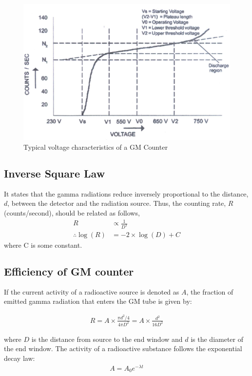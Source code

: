 \begin{figure}
    \centering
    \includegraphics[width=1\columnwidth]{images/t2.png}
    \caption{Typical voltage characteristics of a GM Counter}
    \label{t2}
\end{figure}

\subsection{Inverse Square Law}
It states that the gamma radiations reduce inversely proportional to the distance, $d$, between the detector and the radiation source. Thus, the counting rate, $R$ (counts/second), should be related as follows,
\begin{align} \label{inv-eq}
    R &\propto \frac{1}{D^2} \nonumber\\
    \therefore \log(R) &= -2\times\log(D) + C
\end{align}
\noindent where C is some constant.

\subsection{Efficiency of GM counter}
If the current activity of a radioactive source is denoted as $A$, the fraction of emitted gamma radiation that enters the GM tube is given by:

\begin{align}
    R = A \times \frac{\pi d^2/4}{4 \pi D^2} = A \times \frac{d^2}{16D^2}
\end{align}

where $D$ is the distance from source to the end window and $d$ is the diameter of the end window. 
The activity of a radioactive substance follows the
exponential decay law:
\begin{align}
    A = A_0 e^{-\lambda t}
\end{align}

